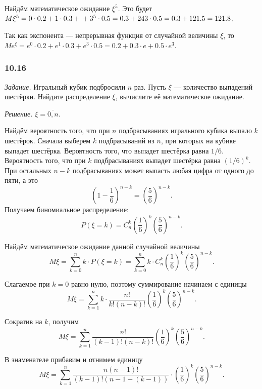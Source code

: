 Найдём математическое ожидание $ \xi^5$.
Это будет $M \xi^5 = 0 \cdot 0.2 + 1 \cdot 0.3 + \\
+ 3^5 \cdot 0.5 = 0.3 + 243 \cdot 0.5 = 0.3 + 121.5 = 121.8$.

Так как экспонента --- непрерывная функция от случайной величины $ \xi $, то $Me^{ \xi } = e^0 \cdot 0.2 + e^1 \cdot 0.3 + e^3 \cdot 0.5 = 0.2 + 0.3 \cdot e + 0.5 \cdot e^3$.

\subsubsection*{10.16}

\textit{Задание.} Игральный кубик подбросили $n$ раз.
Пусть $ \xi $ --- количество выпадений шестёрки.
Найдите распределение $ \xi $, вычислите её математическое ожидание.

\textit{Решение.} $ \xi = \overline{0, n}$.

Найдём вероятность того, что при $n$ подбрасываниях игрального кубика выпало $k$ шестёрок.
Сначала выберем $k$ подбрасываний из $n$, при которых на кубике выпадет шестёрка.
Вероятность того, что выпадет шестёрка равна $1/6$.
Вероятность того, что при $k$ подбрасываниях выпадет шестёрка равна $ \left( 1/6 \right)^k$.
При остальных $n - k$ подбрасываниях может выпасть любая цифра от одного до пяти, а это
$$ \left( 1 - \frac{1}{6} \right)^{n-k} =
\left( \frac{5}{6} \right)^{n-k}.$$
Получаем биномиальное распределение:
$$P \left( \xi = k \right) =
C_n^k \left( \frac{1}{6} \right)^k \left( \frac{5}{6} \right)^{n-k}.$$

Найдём математическое ожидание данной случайной величины
$$M \xi =
\sum \limits_{k=0}^n k \cdot P \left( \xi = k \right) =
\sum \limits_{k=0}^n k \cdot C_n^k \left( \frac{1}{6} \right)^k \left( \frac{5}{6} \right)^{n-k}.$$

Слагаемое при $k = 0$ равно нулю, поэтому суммирование начинаем с единицы
$$M \xi =
\sum \limits_{k=1}^n k \cdot \frac{n!}{k! \left( n-k \right)!} \left( \frac{1}{6} \right)^k \left( \frac{5}{6} \right)^{n-k}.$$

Сократив на $k$, получим
$$M \xi =
\sum \limits_{k=1}^n \frac{n!}{ \left( k-1 \right)! \left( n-k \right)! } \left( \frac{1}{6} \right)^k \left( \frac{5}{6} \right)^{n-k}.$$

В знаменателе прибавим и отнимем единицу
$$M \xi =
\sum \limits_{k=1}^n \frac{n \left( n-1 \right)!}{ \left( k-1 \right)! \left( n - 1 - \left( k-1 \right) \right) } \cdot
\left( \frac{1}{6} \right)^k \left( \frac{5}{6} \right)^{n-k}.$$


